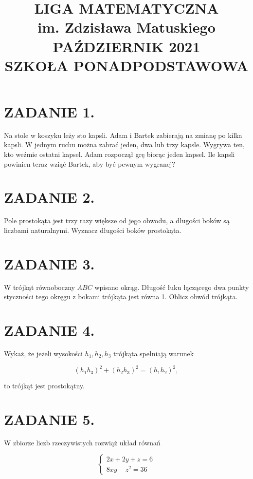 \documentclass[10pt]{article}
\title{LIGA MATEMATYCZNA \\
 im. Zdzisława Matuskiego \\
 PAŹDZIERNIK 2021 \\
 SZKOŁA PONADPODSTAWOWA }
\author{}
\date{}
\begin{document}
\maketitle
\section*{ZADANIE 1.}
Na stole w koszyku leży sto kapsli. Adam i Bartek zabierają na zmianę po kilka kapsli. W jednym ruchu można zabrać jeden, dwa lub trzy kapsle. Wygrywa ten, kto weźmie ostatni kapsel. Adam rozpoczął grę biorąc jeden kapsel. Ile kapsli powinien teraz wziąć Bartek, aby być pewnym wygranej?

\section*{ZADANIE 2.}
Pole prostokąta jest trzy razy większe od jego obwodu, a długości boków są liczbami naturalnymi. Wyznacz długości boków prostokąta.

\section*{ZADANIE 3.}
W trójkąt równoboczny \(A B C\) wpisano okrąg. Długość łuku łączącego dwa punkty styczności tego okręgu z bokami trójkąta jest równa 1. Oblicz obwód trójkąta.

\section*{ZADANIE 4.}
Wykaż, że jeżeli wysokości \(h_{1}, h_{2}, h_{3}\) trójkąta spełniają warunek

\[
\left(h_{1} h_{3}\right)^{2}+\left(h_{2} h_{3}\right)^{2}=\left(h_{1} h_{2}\right)^{2},
\]

to trójkąt jest prostokątny.

\section*{ZADANIE 5.}
W zbiorze liczb rzeczywistych rozwiąż układ równań

\[
\left\{\begin{array}{l}
2 x+2 y+z=6 \\
8 x y-z^{2}=36
\end{array}\right.
\]
\end{document}
